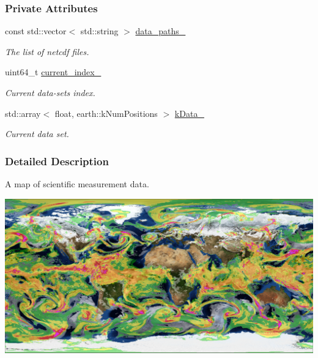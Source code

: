 \subsubsection*{Private Attributes}
\begin{DoxyCompactItemize}
\item 
\mbox{\label{classosse_1_1collaborate_1_1_earth_data_aec97d6b176f78cc12e94038ca93234ba}} 
const std\+::vector$<$ std\+::string $>$ \hyperlink{classosse_1_1collaborate_1_1_earth_data_aec97d6b176f78cc12e94038ca93234ba}{data\+\_\+paths\+\_\+}
\begin{DoxyCompactList}\small\item\em The list of netcdf files. \end{DoxyCompactList}\item 
\mbox{\label{classosse_1_1collaborate_1_1_earth_data_ad6b69b9ff9d275e6546fd940c0a9d21c}} 
uint64\+\_\+t \hyperlink{classosse_1_1collaborate_1_1_earth_data_ad6b69b9ff9d275e6546fd940c0a9d21c}{current\+\_\+index\+\_\+}
\begin{DoxyCompactList}\small\item\em Current data-\/set\textquotesingle{}s index. \end{DoxyCompactList}\item 
\mbox{\label{classosse_1_1collaborate_1_1_earth_data_a8a2c4b1c349e08640731dc8062a83fe7}} 
std\+::array$<$ float, earth\+::k\+Num\+Positions $>$ \hyperlink{classosse_1_1collaborate_1_1_earth_data_a8a2c4b1c349e08640731dc8062a83fe7}{k\+Data\+\_\+}
\begin{DoxyCompactList}\small\item\em Current data set. \end{DoxyCompactList}\end{DoxyCompactItemize}


\subsubsection{Detailed Description}
A map of scientific measurement data. 

 
\begin{DoxyImageNoCaption}
  \mbox{\includegraphics[width=\textwidth]{combined}}
\end{DoxyImageNoCaption}
 

